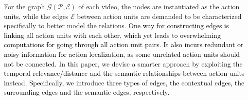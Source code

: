 \documentclass[10pt,journal,compsoc]{IEEEtran}
\def\hao{\textcolor{black}}
\begin{document}
	For the graph $\mathcal{G}(\mathcal{P},\mathcal{E})$ of each video, the nodes are instantiated as the action units, while the edges $\mathcal{E}$ between action units are demanded to be characterized specifically to better model the relations.
	\hao{One way for constructing edges is linking all action units with each other, which yet leads to overwhelming computations for going through all action unit pairs. It also incurs redundant or noisy information for action localization, as some unrelated action units should not be connected. In this paper, we devise a smarter approach by exploiting the temporal relevance/distance and the semantic relationships between action units instead. Specifically, we introduce three types of edges, the contextual edges, the surrounding edges and the semantic edges, respectively. }
	
	
	
	
\end{document}
